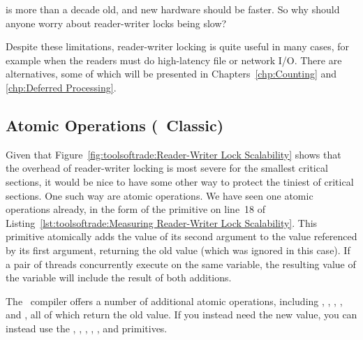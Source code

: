 \QuickQuiz{}
	 is more than a decade old, and new hardware should
	be faster.
	So why should anyone worry about reader-writer locks being slow?
 \QuickQuizEnd

Despite these limitations, reader-writer locking is quite useful in many
cases, for example when the readers must do high-latency file or network I/O.
There are alternatives, some of which will be presented in
Chapters~\ref{chp:Counting} and \ref{chp:Deferred Processing}.

\subsection{Atomic Operations (\GCC\ Classic)}
\label{sec:toolsoftrade:Atomic Operations (gcc Classic)}

Given that
Figure~\ref{fig:toolsoftrade:Reader-Writer Lock Scalability}
shows that the overhead of reader-writer locking is most severe for the
smallest critical sections, it would be nice to have some other way
to protect the tiniest of critical sections.
One such way are atomic operations.
We have seen one atomic operations already, in the form of the
 primitive on line~18 of
Listing~\ref{lst:toolsoftrade:Measuring Reader-Writer Lock Scalability}.
This primitive atomically adds the value of its second argument to
the value referenced by its first argument, returning the old value
(which was ignored in this case).
If a pair of threads concurrently execute  on
the same variable, the resulting value of the variable will include
the result of both additions.

The \GNUC\ compiler offers a number of additional atomic operations,
including ,
,
,
, and
, all of which return the old value.
If you instead need the new value, you can instead use the
,
,
,
,
, and
 primitives.

